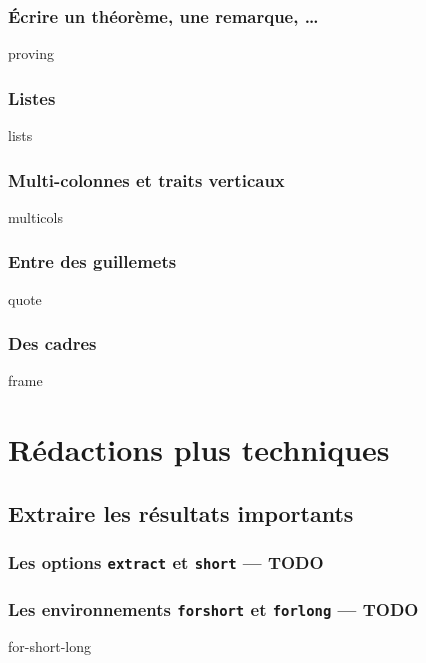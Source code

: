 \documentclass[12pt]{memoir}
\begin{document}
\section{Écrire un théorème, une remarque, \dots}

{proving}




\section{Listes}

{lists}




\section{Multi-colonnes et traits verticaux}

{multicols}




\section{Entre des guillemets}

{quote}




\section{Des cadres}

{frame}




\part{Rédactions plus techniques}

\chapter{Extraire les résultats importants}

\section{Les options \texttt{extract} et \texttt{short} --- TODO}




\section{Les environnements \texttt{forshort} et \texttt{forlong} --- TODO}

{for-short-long}










%
%
%
\end{document}
